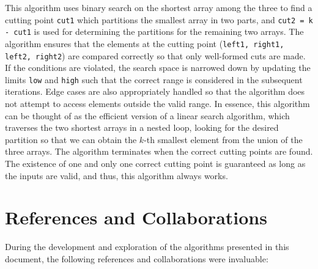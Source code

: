 \documentclass{article}
\begin{document}
This algorithm uses binary search on the shortest array among the three to find a cutting point \texttt{cut1} which partitions the smallest array in two parts, and \texttt{cut2 = k - cut1} is used for determining the partitions for the remaining two arrays. \newline \newline The algorithm ensures that the elements at the cutting point (\texttt{left1, right1, left2, right2}) are compared correctly so that only well-formed cuts are made. If the conditions are violated, the search space is narrowed down by updating the limits \texttt{low} and \texttt{high} such that the correct range is considered in the subsequent iterations. \newline \newline Edge cases are also appropriately handled so that the algorithm does not attempt to access elements outside the valid range. \newline \newline In essence, this algorithm can be thought of as the efficient version of a linear search algorithm, which traverses the two shortest arrays in a nested loop, looking for the desired partition so that we can obtain the \(k\)-th smallest element from the union of the three arrays. \newline \newline The algorithm terminates when the correct cutting points are found. The existence of one and only one correct cutting point is guaranteed as long as the inputs are valid, and thus, this algorithm always works.

\section{References and Collaborations}

During the development and exploration of the algorithms presented in this document, the following references and collaborations were invaluable:
\end{document}
